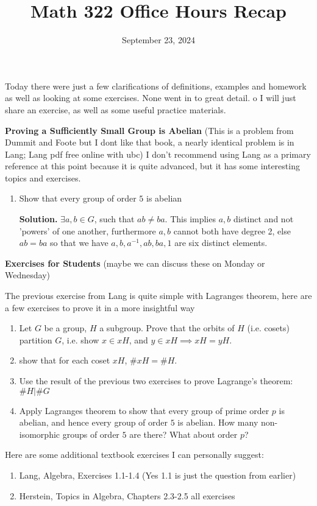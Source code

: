\documentclass[10.5pt]{article}
\title{\vspace{-2cm} Math 322 Office Hours Recap}
\date{September 23, 2024}
\theoremstyle{definition}
\begin{document}
    \maketitle

    Today there were just a few clarifications of definitions, examples and homework as well as looking at some exercises.
    None went in to great detail. o I will just share an exercise, as well as some useful practice materials.\newline

    \textbf{Proving a Sufficiently Small Group is Abelian} \newline 
    (This is a problem from Dummit and Foote but I dont like that book, a nearly identical problem is in Lang; Lang pdf free online with ubc) I don't recommend using Lang as a primary reference at this point
    because it is quite advanced, but it has some interesting topics and exercises.
    \begin{enumerate}
        \item Show that every group of order \(5\) is abelian
        
        \textbf{Solution.} \(\exists a,b \in G\), such that \(ab \neq ba\). This implies \(a,b\) distinct and not 'powers' of one another, furthermore
        \(a,b\) cannot both have degree 2, else \(ab = ba\) so that we have \(a,b,a^{-1},ab,ba,1\) are six distinct elements.
    \end{enumerate}

    \textbf{Exercises for Students} (maybe we can discuss these on Monday or Wednesday)

    The previous exercise from Lang is quite simple with Lagranges theorem, here are a few exercises to prove it in a more insightful way
    \begin{enumerate}
        \item Let \(G\) be a group, \(H\) a subgroup. Prove that the orbits of \(H\) (i.e. cosets) partition \(G\), i.e. show \(x \in xH\), and
        \(y \in xH \implies xH = yH\).

        \item show that for each coset \(xH\), \(\# xH = \# H\).
        
        \item Use the result of the previous two exercises to prove Lagrange's theorem: \(\# H | \# G\)
        
        \item Apply Lagranges theorem to show that every group of prime order \(p\) is abelian, and hence every group of order \(5\) is abelian.
        How many non-isomorphic groups of order \(5\) are there? What about order \(p\)?
    \end{enumerate}

    Here are some additional textbook exercises I can personally suggest:
    \begin{enumerate}
        \item Lang, Algebra, Exercises 1.1-1.4 (Yes 1.1 is just the question from earlier)
        \item Herstein, Topics in Algebra, Chapters 2.3-2.5 all exercises
    \end{enumerate}
\end{document}
